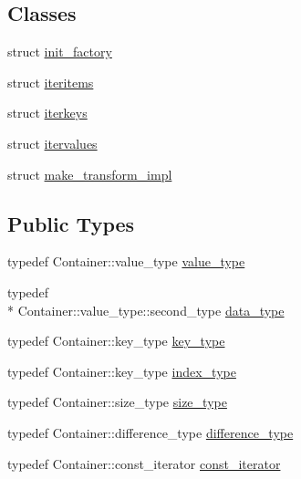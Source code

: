 \subsection*{Classes}
\begin{DoxyCompactItemize}
\item 
struct \hyperlink{structboost_1_1python_1_1std__map__indexing__suite_1_1init__factory}{init\-\_\-factory}
\item 
struct \hyperlink{structboost_1_1python_1_1std__map__indexing__suite_1_1iteritems}{iteritems}
\item 
struct \hyperlink{structboost_1_1python_1_1std__map__indexing__suite_1_1iterkeys}{iterkeys}
\item 
struct \hyperlink{structboost_1_1python_1_1std__map__indexing__suite_1_1itervalues}{itervalues}
\item 
struct \hyperlink{structboost_1_1python_1_1std__map__indexing__suite_1_1make__transform__impl}{make\-\_\-transform\-\_\-impl}
\end{DoxyCompactItemize}
\subsection*{Public Types}
\begin{DoxyCompactItemize}
\item 
typedef Container\-::value\-\_\-type \hyperlink{classboost_1_1python_1_1std__map__indexing__suite_aff9ed68cf30e805a04a313d92c62ab38}{value\-\_\-type}
\item 
typedef \\*
Container\-::value\-\_\-type\-::second\-\_\-type \hyperlink{classboost_1_1python_1_1std__map__indexing__suite_a3e9a6a8b8ba34759cf0ba99fe5966041}{data\-\_\-type}
\item 
typedef Container\-::key\-\_\-type \hyperlink{classboost_1_1python_1_1std__map__indexing__suite_a4e2daeb60a58d6ce9964e0ea27680009}{key\-\_\-type}
\item 
typedef Container\-::key\-\_\-type \hyperlink{classboost_1_1python_1_1std__map__indexing__suite_a4b2ac75883fba93dbca6d9e83197c842}{index\-\_\-type}
\item 
typedef Container\-::size\-\_\-type \hyperlink{classboost_1_1python_1_1std__map__indexing__suite_ad1c24ad53b2e27b061f75591c74296c2}{size\-\_\-type}
\item 
typedef Container\-::difference\-\_\-type \hyperlink{classboost_1_1python_1_1std__map__indexing__suite_a54aa644dcb3913334f8b0152901940ef}{difference\-\_\-type}
\item 
typedef Container\-::const\-\_\-iterator \hyperlink{classboost_1_1python_1_1std__map__indexing__suite_aae0c4473455223a4e048cc207ca7b3ea}{const\-\_\-iterator}
\end{DoxyCompactItemize}
